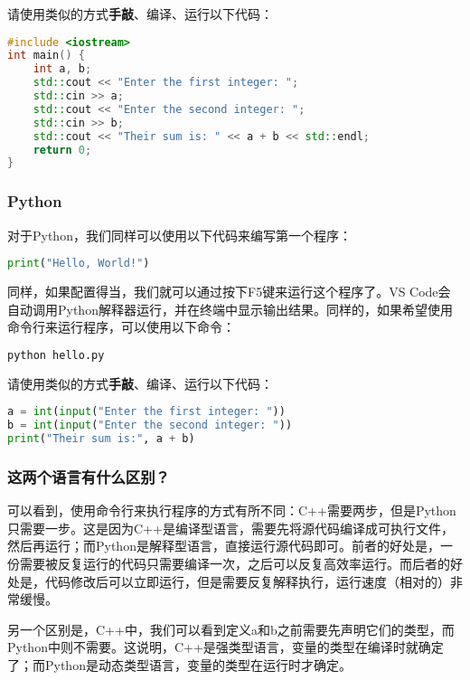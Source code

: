 \documentclass[../main.tex]{subfiles}
\begin{document}
请使用类似的方式\textbf{手敲}、编译、运行以下代码：

\begin{lstlisting}[language=C++]
#include <iostream>
int main() {
    int a, b;
    std::cout << "Enter the first integer: ";
    std::cin >> a;
    std::cout << "Enter the second integer: ";
    std::cin >> b;
    std::cout << "Their sum is: " << a + b << std::endl;
    return 0;
}
\end{lstlisting}

\subsubsection{Python}

对于Python，我们同样可以使用以下代码来编写第一个程序：

\begin{lstlisting}[language=Python]
print("Hello, World!")
\end{lstlisting}

同样，如果配置得当，我们就可以通过按下F5键来运行这个程序了。VS Code会自动调用Python解释器运行，并在终端中显示输出结果。同样的，如果希望使用命令行来运行程序，可以使用以下命令：

\begin{lstlisting}[language=bash]
python hello.py
\end{lstlisting}

请使用类似的方式\textbf{手敲}、编译、运行以下代码：

\begin{lstlisting}[language=Python]
a = int(input("Enter the first integer: "))
b = int(input("Enter the second integer: "))
print("Their sum is:", a + b)
\end{lstlisting}

\subsubsection{这两个语言有什么区别？}

可以看到，使用命令行来执行程序的方式有所不同：C++需要两步，但是Python只需要一步。这是因为C++是编译型语言，需要先将源代码编译成可执行文件，然后再运行；而Python是解释型语言，直接运行源代码即可。前者的好处是，一份需要被反复运行的代码只需要编译一次，之后可以反复高效率运行。而后者的好处是，代码修改后可以立即运行，但是需要反复解释执行，运行速度（相对的）非常缓慢。

另一个区别是，C++中，我们可以看到定义a和b之前需要先声明它们的类型，而Python中则不需要。这说明，C++是强类型语言，变量的类型在编译时就确定了；而Python是动态类型语言，变量的类型在运行时才确定。
\end{document}
